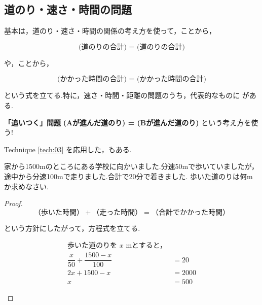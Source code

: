 \subsection{道のり・速さ・時間の問題}

    基本は，道のり・速さ・時間の関係の考え方を使って，ことから，

    \[\textbf{(道のりの合計) = (道のりの合計)}\]

    や，ことから，

    \[\textbf{(かかった時間の合計) = (かかった時間の合計)}\]

    \vspace{1.5em}
    という式を立てる.特に，速さ・時間・距離の問題のうち，代表的なものに
    がある.
    \vspace{1em}

    \begin{techniquebox}[tech:03]{\textbf{「追いつく」問題}}
        \textbf{(Aが進んだ道のり) = (Bが進んだ道のり)} という考え方を使う!
    \end{techniquebox}

    \vspace{1em}
    Technique \ref{tech:03} を応用した，もある.

    \begin{example}[【例題 2】]
        家から1500mのところにある学校に向かいました.分速50mで歩いていましたが，
        途中から分速100mで走りました.合計で20分で着きました.
        歩いた道のりは何mか求めなさい.
    \end{example}

    \begin{proof}\mbox{}\\
        \[（歩いた時間）+（走った時間）=（合計でかかった時間）\]

        という方針にしたがって，方程式を立てる.

        \begin{hiddenanswer}
            \begin{align*}
                \text{歩いた道のりを $x$ mとすると，}\\
                \dfrac{x}{50} + \dfrac{1500 - x}{100} &= 20 \\
                2x + 1500 - x &= 2000 \\
                x &= 500
            \end{align*}

        \end{hiddenanswer}
    \end{proof}
\newpage
